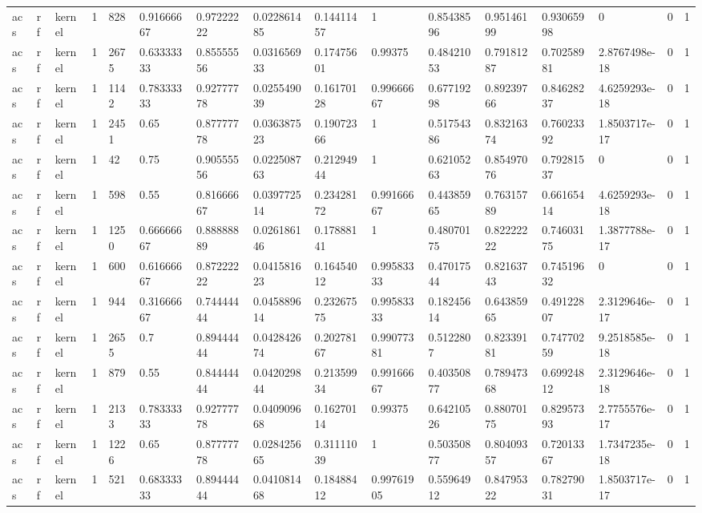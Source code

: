 \begin{tabular}{llllllllllllllll}
acs & rf & kernel & 1 & 828 & 0.91666667 & 0.97222222 & 0.022861485 & 0.14411457 & 1 & 0.85438596 & 0.95146199 & 0.93065998 & 0 & 0 & 1 \\
acs & rf & kernel & 1 & 2675 & 0.63333333 & 0.85555556 & 0.031656933 & 0.17475601 & 0.99375 & 0.48421053 & 0.79181287 & 0.70258981 & 2.8767498e-18 & 0 & 1 \\
acs & rf & kernel & 1 & 1142 & 0.78333333 & 0.92777778 & 0.025549039 & 0.16170128 & 0.99666667 & 0.67719298 & 0.89239766 & 0.84628237 & 4.6259293e-18 & 0 & 1 \\
acs & rf & kernel & 1 & 2451 & 0.65 & 0.87777778 & 0.036387523 & 0.19072366 & 1 & 0.51754386 & 0.83216374 & 0.76023392 & 1.8503717e-17 & 0 & 1 \\
acs & rf & kernel & 1 & 42 & 0.75 & 0.90555556 & 0.022508763 & 0.21294944 & 1 & 0.62105263 & 0.85497076 & 0.79281537 & 0 & 0 & 1 \\
acs & rf & kernel & 1 & 598 & 0.55 & 0.81666667 & 0.039772514 & 0.23428172 & 0.99166667 & 0.44385965 & 0.76315789 & 0.66165414 & 4.6259293e-18 & 0 & 1 \\
acs & rf & kernel & 1 & 1250 & 0.66666667 & 0.88888889 & 0.026186146 & 0.17888141 & 1 & 0.48070175 & 0.82222222 & 0.74603175 & 1.3877788e-17 & 0 & 1 \\
acs & rf & kernel & 1 & 600 & 0.61666667 & 0.87222222 & 0.041581623 & 0.16454012 & 0.99583333 & 0.47017544 & 0.82163743 & 0.74519632 & 0 & 0 & 1 \\
acs & rf & kernel & 1 & 944 & 0.31666667 & 0.74444444 & 0.045889614 & 0.23267575 & 0.99583333 & 0.18245614 & 0.64385965 & 0.49122807 & 2.3129646e-17 & 0 & 1 \\
acs & rf & kernel & 1 & 2655 & 0.7 & 0.89444444 & 0.042842674 & 0.20278167 & 0.99077381 & 0.5122807 & 0.82339181 & 0.74770259 & 9.2518585e-18 & 0 & 1 \\
acs & rf & kernel & 1 & 879 & 0.55 & 0.84444444 & 0.042029844 & 0.21359934 & 0.99166667 & 0.40350877 & 0.78947368 & 0.69924812 & 2.3129646e-18 & 0 & 1 \\
acs & rf & kernel & 1 & 2133 & 0.78333333 & 0.92777778 & 0.040909668 & 0.16270114 & 0.99375 & 0.64210526 & 0.88070175 & 0.82957393 & 2.7755576e-17 & 0 & 1 \\
acs & rf & kernel & 1 & 1226 & 0.65 & 0.87777778 & 0.028425665 & 0.31111039 & 1 & 0.50350877 & 0.80409357 & 0.72013367 & 1.7347235e-18 & 0 & 1 \\
acs & rf & kernel & 1 & 521 & 0.68333333 & 0.89444444 & 0.041081468 & 0.18488412 & 0.99761905 & 0.55964912 & 0.84795322 & 0.78279031 & 1.8503717e-17 & 0 & 1 \\

\end{tabular}
